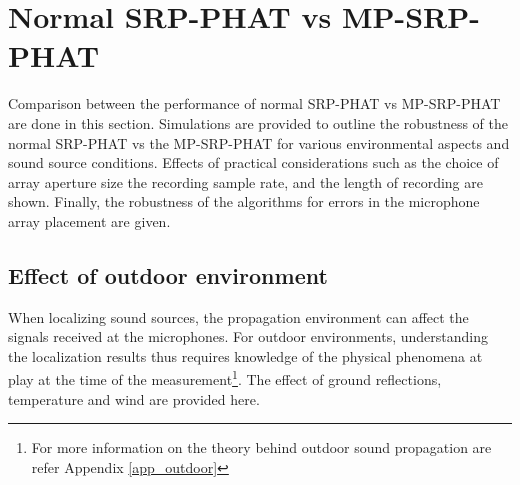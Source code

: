 \section{Normal SRP-PHAT vs MP-SRP-PHAT}
Comparison between the performance of normal SRP-PHAT vs MP-SRP-PHAT are done in this section. Simulations are provided to outline the robustness of the normal SRP-PHAT vs the MP-SRP-PHAT for various environmental aspects and sound source conditions. Effects of practical considerations such as the choice of array aperture size the recording sample rate, and the length of recording are shown. Finally, the robustness of the algorithms for errors in the microphone array placement are given.
\subsection{Effect of outdoor environment}
When localizing sound sources, the propagation environment can affect the signals received at the microphones. For outdoor environments, understanding the localization results thus requires knowledge of the physical phenomena at play at the time of the measurement\footnote{For more information on the theory behind outdoor sound propagation are refer Appendix \ref{app_outdoor}}. The effect of ground reflections, temperature and wind are provided here.
